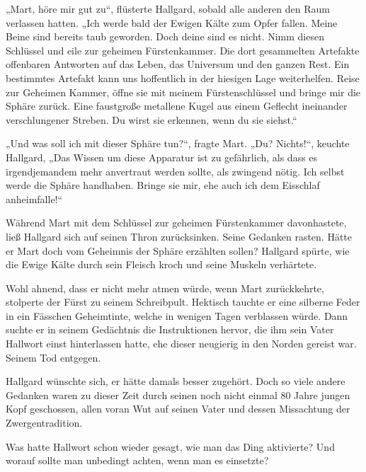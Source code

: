 „Mart, höre mir gut zu“, flüsterte Hallgard, sobald alle anderen den Raum verlassen hatten. „Ich werde bald der Ewigen Kälte zum Opfer fallen. Meine Beine sind bereits taub geworden. Doch deine sind es nicht. Nimm diesen Schlüssel und eile zur geheimen Fürstenkammer. Die dort gesammelten Artefakte offenbaren Antworten auf das Leben, das Universum und den ganzen Rest. Ein bestimmtes Artefakt kann uns hoffentlich in der hiesigen Lage weiterhelfen. Reise zur Geheimen Kammer, öffne sie mit meinem Fürstenschlüssel und bringe mir die Sphäre zurück. Eine faustgroße metallene Kugel aus einem Geflecht ineinander verschlungener Streben. Du wirst sie erkennen, wenn du sie siehst.“ 

„Und was soll ich mit dieser Sphäre tun?“, fragte Mart. „Du? Nichts!“, keuchte Hallgard, „Das Wissen um diese Apparatur ist zu gefährlich, als dass es irgendjemandem mehr anvertraut werden sollte, als zwingend nötig. Ich selbst werde die Sphäre handhaben. Bringe sie mir, ehe auch ich dem Eisschlaf anheimfalle!“



\trennzeichen



Während Mart mit dem Schlüssel zur geheimen Fürstenkammer davonhastete, ließ Hallgard sich auf seinen Thron zurücksinken. Seine Gedanken rasten. Hätte er Mart doch vom Geheimnis der Sphäre erzählten sollen? Hallgard spürte, wie die Ewige Kälte durch sein Fleisch kroch und seine Muskeln verhärtete.

Wohl ahnend, dass er nicht mehr atmen würde, wenn Mart zurückkehrte, stolperte der Fürst zu seinem Schreibpult. Hektisch tauchte er eine silberne Feder in ein Fässchen Geheimtinte, welche in wenigen Tagen verblassen würde. Dann suchte er in seinem Gedächtnis die Instruktionen hervor, die ihm sein Vater Hallwort einst hinterlassen hatte, ehe dieser neugierig in den Norden gereist war. Seinem Tod entgegen.

Hallgard wünschte sich, er hätte damals besser zugehört. Doch so viele andere Gedanken waren zu dieser Zeit durch seinen noch nicht einmal 80 Jahre jungen Kopf geschossen, allen voran Wut auf seinen Vater und dessen Missachtung der Zwergentradition.

Was hatte Hallwort schon wieder gesagt, wie man das Ding aktivierte? Und worauf sollte man unbedingt achten, wenn man es einsetzte?



\trennzeichen



